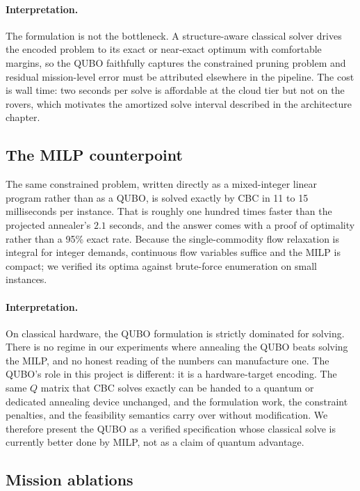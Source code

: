 \paragraph{Interpretation.}
The formulation is not the bottleneck. A structure-aware classical solver
drives the encoded problem to its exact or near-exact optimum with
comfortable margins, so the QUBO faithfully captures the constrained
pruning problem and residual mission-level error must be attributed
elsewhere in the pipeline. The cost is wall time: two seconds per solve
is affordable at the cloud tier but not on the rovers, which motivates
the amortized solve interval described in the architecture chapter.

\subsection{The MILP counterpoint}
\label{sec:res-milp}

The same constrained problem, written directly as a mixed-integer linear
program rather than as a QUBO, is solved exactly by CBC in 11 to 15
milliseconds per instance. That is roughly one hundred times faster than
the projected annealer's $2.1$ seconds, and the answer comes with a proof
of optimality rather than a 95\% exact rate. Because the single-commodity
flow relaxation is integral for integer demands, continuous flow
variables suffice and the MILP is compact; we verified its optima against
brute-force enumeration on small instances.

\paragraph{Interpretation.}
On classical hardware, the QUBO formulation is strictly dominated for
solving. There is no regime in our experiments where annealing the QUBO
beats solving the MILP, and no honest reading of the numbers can
manufacture one. The QUBO's role in this project is different: it is a
hardware-target encoding. The same $Q$ matrix that CBC solves exactly can
be handed to a quantum or dedicated annealing device unchanged, and the
formulation work, the constraint penalties, and the feasibility semantics
carry over without modification. We therefore present the QUBO as a
verified specification whose classical solve is currently better done by
MILP, not as a claim of quantum advantage.

\subsection{Mission ablations}
\label{sec:res-ablation}


